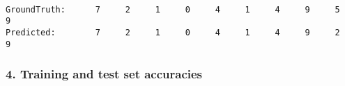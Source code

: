 \documentclass[11pt]{article}
\begin{document}
    \begin{center}
    \end{center}
    { \hspace*{\fill} \\}
    
    \begin{Verbatim}[commandchars=\\\{\}]
GroundTruth:      7     2     1     0     4     1     4     9     5     9
Predicted:        7     2     1     0     4     1     4     9     2     9

    \end{Verbatim}

    \subsubsection{4. Training and test set
accuracies}\label{training-and-test-set-accuracies}
\end{document}
